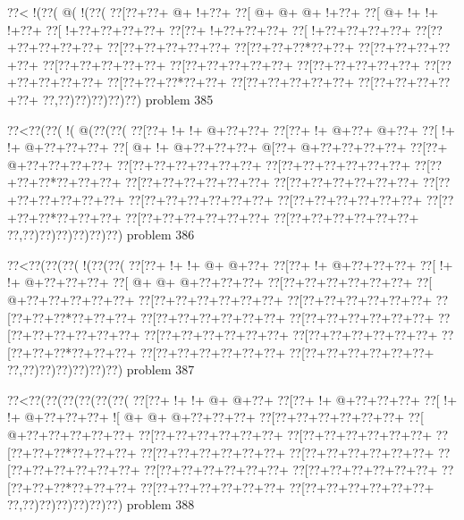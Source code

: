 \vbox{\vbox{\goo
\0??<\- !(\0??(\- @(\- !(\0??(
\0??[\0??+\0??+\- @+\- !+\0??+
\0??[\- @+\- @+\- @+\- !+\0??+
\0??[\- @+\- !+\- !+\- !+\0??+
\0??[\- !+\0??+\0??+\0??+\0??+
\0??[\0??+\- !+\0??+\0??+\0??+
\0??[\- !+\0??+\0??+\0??+\0??+
\0??[\0??+\0??+\0??+\0??+\0??+
\0??[\0??+\0??+\0??+\0??+\0??+
\0??[\0??+\0??+\0??*\0??+\0??+
\0??[\0??+\0??+\0??+\0??+\0??+
\0??[\0??+\0??+\0??+\0??+\0??+
\0??[\0??+\0??+\0??+\0??+\0??+
\0??[\0??+\0??+\0??+\0??+\0??+
\0??[\0??+\0??+\0??+\0??+\0??+
\0??[\0??+\0??+\0??*\0??+\0??+
\0??[\0??+\0??+\0??+\0??+\0??+
\0??[\0??+\0??+\0??+\0??+\0??+
\0??,\0??)\0??)\0??)\0??)\0??)
}
\hfil problem 385\hfil\break
}

\vbox{\vbox{\goo
\0??<\0??(\0??(\- !(\- @(\0??(\0??(
\0??[\0??+\- !+\- !+\- @+\0??+\0??+
\0??[\0??+\- !+\- @+\0??+\- @+\0??+
\0??[\- !+\- !+\- @+\0??+\0??+\0??+
\0??[\- @+\- !+\- @+\0??+\0??+\0??+
\- @[\0??+\- @+\0??+\0??+\0??+\0??+
\0??[\0??+\- @+\0??+\0??+\0??+\0??+
\0??[\0??+\0??+\0??+\0??+\0??+\0??+
\0??[\0??+\0??+\0??+\0??+\0??+\0??+
\0??[\0??+\0??+\0??*\0??+\0??+\0??+
\0??[\0??+\0??+\0??+\0??+\0??+\0??+
\0??[\0??+\0??+\0??+\0??+\0??+\0??+
\0??[\0??+\0??+\0??+\0??+\0??+\0??+
\0??[\0??+\0??+\0??+\0??+\0??+\0??+
\0??[\0??+\0??+\0??+\0??+\0??+\0??+
\0??[\0??+\0??+\0??*\0??+\0??+\0??+
\0??[\0??+\0??+\0??+\0??+\0??+\0??+
\0??[\0??+\0??+\0??+\0??+\0??+\0??+
\0??,\0??)\0??)\0??)\0??)\0??)\0??)
}
\hfil problem 386\hfil\break
}

\vbox{\vbox{\goo
\0??<\0??(\0??(\0??(\- !(\0??(\0??(
\0??[\0??+\- !+\- !+\- @+\- @+\0??+
\0??[\0??+\- !+\- @+\0??+\0??+\0??+
\0??[\- !+\- !+\- @+\0??+\0??+\0??+
\0??[\- @+\- @+\- @+\0??+\0??+\0??+
\0??[\0??+\0??+\0??+\0??+\0??+\0??+
\0??[\- @+\0??+\0??+\0??+\0??+\0??+
\0??[\0??+\0??+\0??+\0??+\0??+\0??+
\0??[\0??+\0??+\0??+\0??+\0??+\0??+
\0??[\0??+\0??+\0??*\0??+\0??+\0??+
\0??[\0??+\0??+\0??+\0??+\0??+\0??+
\0??[\0??+\0??+\0??+\0??+\0??+\0??+
\0??[\0??+\0??+\0??+\0??+\0??+\0??+
\0??[\0??+\0??+\0??+\0??+\0??+\0??+
\0??[\0??+\0??+\0??+\0??+\0??+\0??+
\0??[\0??+\0??+\0??*\0??+\0??+\0??+
\0??[\0??+\0??+\0??+\0??+\0??+\0??+
\0??[\0??+\0??+\0??+\0??+\0??+\0??+
\0??,\0??)\0??)\0??)\0??)\0??)\0??)
}
\hfil problem 387\hfil\break
}

\vbox{\vbox{\goo
\0??<\0??(\0??(\0??(\0??(\0??(\0??(
\0??[\0??+\- !+\- !+\- @+\- @+\0??+
\0??[\0??+\- !+\- @+\0??+\0??+\0??+
\0??[\- !+\- !+\- @+\0??+\0??+\0??+
\- ![\- @+\- @+\- @+\0??+\0??+\0??+
\0??[\0??+\0??+\0??+\0??+\0??+\0??+
\0??[\- @+\0??+\0??+\0??+\0??+\0??+
\0??[\0??+\0??+\0??+\0??+\0??+\0??+
\0??[\0??+\0??+\0??+\0??+\0??+\0??+
\0??[\0??+\0??+\0??*\0??+\0??+\0??+
\0??[\0??+\0??+\0??+\0??+\0??+\0??+
\0??[\0??+\0??+\0??+\0??+\0??+\0??+
\0??[\0??+\0??+\0??+\0??+\0??+\0??+
\0??[\0??+\0??+\0??+\0??+\0??+\0??+
\0??[\0??+\0??+\0??+\0??+\0??+\0??+
\0??[\0??+\0??+\0??*\0??+\0??+\0??+
\0??[\0??+\0??+\0??+\0??+\0??+\0??+
\0??[\0??+\0??+\0??+\0??+\0??+\0??+
\0??,\0??)\0??)\0??)\0??)\0??)\0??)
}
\hfil problem 388\hfil\break
}

